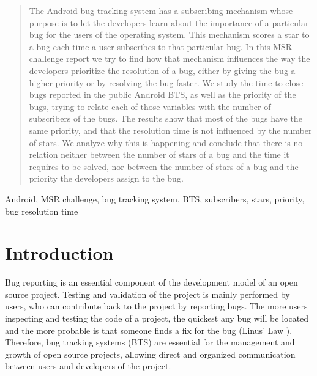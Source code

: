 \documentclass[10pt, conference, compsocconf]{IEEEtran}
\begin{document}
\begin{abstract}
The Android bug tracking system has a subscribing mechanism whose
purpose is to let the developers learn about the importance of a
particular bug for the users of the operating system. This mechanism
scores a star to a bug each time a user subscribes to that particular
bug. In this MSR challenge report we try to find how that mechanism
influences the way the developers prioritize the resolution of a bug,
either by giving the bug a higher priority or by resolving the bug
faster. We study the time to close bugs reported in the public Android
BTS, as well as the priority of the bugs, trying to relate each of
those variables with the number of subscribers of the bugs. The
results show that most of the bugs have the same priority, and that
the resolution time is not influenced by the number of stars. We
analyze why this is happening and conclude that there is no relation
neither between the number of stars of a bug and the time it requires to be solved, nor between the number of stars of a bug and the priority the developers assign to the bug.
\end{abstract}

\begin{IEEEkeywords}
Android, MSR challenge, bug tracking system, BTS, subscribers, stars, priority, bug resolution time
\end{IEEEkeywords}


%
\IEEEpeerreviewmaketitle



\section{Introduction}
Bug reporting is an essential component of the development model of an open source project. Testing and validation of the project is mainly performed by users, who can contribute back to the project by reporting bugs. The more users inspecting and testing the code of a project, the quickest any bug will be located and the more probable is that someone finds a fix for the bug (Linus' Law \cite{CathedralBazaar}). Therefore, bug tracking systems (BTS) are essential for the management and growth of open source projects, allowing direct and organized communication between users and developers of the project.
\end{document}

